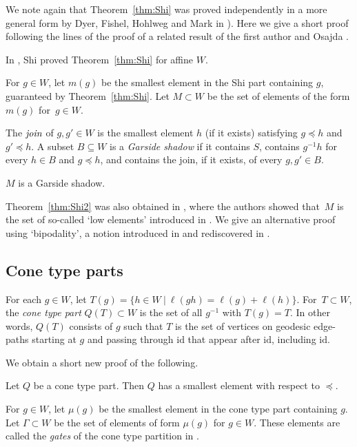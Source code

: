 \documentclass[Unicode,ALCO]{cedram}
\newcommand{\id}{\mathrm{id}}
\begin{document}
We note again that Theorem~\ref{thm:Shi} was proved independently in a more general form by Dyer, Fishel, Hohlweg and Mark in \cite[Thm.~1.1(1)]{DHFM}). 
Here we give a short proof following the lines of the proof of a related result of the first author and Osajda \cite[Thm.~2.1]{OP}.

In \cite{Shi_1987}, Shi proved Theorem~\ref{thm:Shi} for affine $W$.

For $g\in W$, let $m(g)$ be the smallest element in the Shi part containing $g$, guaranteed by Theorem~\ref{thm:Shi}. 
Let $M\subset W$ be the set of elements of the form $m(g)$ for~$g\in W$. 

The $\emph{join}$ of $g,g'\in W$ is the smallest element $h$ (if it exists) satisfying $g\preceq h$ and~$g'\preceq h$. A subset $B\subseteq W$ is a \emph{Garside shadow} if it contains $S$, contains $g^{-1}h$ for every $h\in B$ and $g\preceq h$, and contains the join, if it exists, of every $g,g'\in B$.

\begin{thm}
	\label{thm:Shi2}
	$M$ is a Garside shadow.
\end{thm}

Theorem~\ref{thm:Shi2} was also obtained in \cite[Thm.~1.1(2)]{DHFM}, where the authors showed that~$M$ is the set of so-called `low elements' introduced in \cite{DH}. We give an alternative  proof using `bipodality', a notion introduced in \cite{DH} and rediscovered in \cite{OP}.

\subsection*{Cone type parts} 

For each $g\in W$, let $T(g)=\{h\in W \ | \ \ell(gh)=\ell(g)+\ell(h)\}$. For~$T\subset W$, the \emph{cone type part} $Q(T)\subset W$ is the set of all $g^{-1}$ with $T(g)=T$. In other words, $Q(T)$ consists of $g$ such that $T$ is the set of vertices on geodesic edge-paths starting at $g$ and passing through $\id$ that appear after $\id$, including $\id$. 

We obtain a short new proof of the following.

\begin{thm} 
	\label{thm:conetype}
	{\cite[Thm.~1]{Parkinson-Yau_2022}} Let $Q$ be a cone type part. Then $Q$ has a smallest element with respect to $\preceq$.
\end{thm}

For $g\in W$, let $\mu(g)$ be the smallest element in the cone type part containing $g$. Let $\Gamma\subset W$ be the set of elements of form $\mu(g)$ for $g\in W$. These elements are called the \textit{gates} of the cone type partition in \cite{Parkinson-Yau_2022}. 
\end{document}
